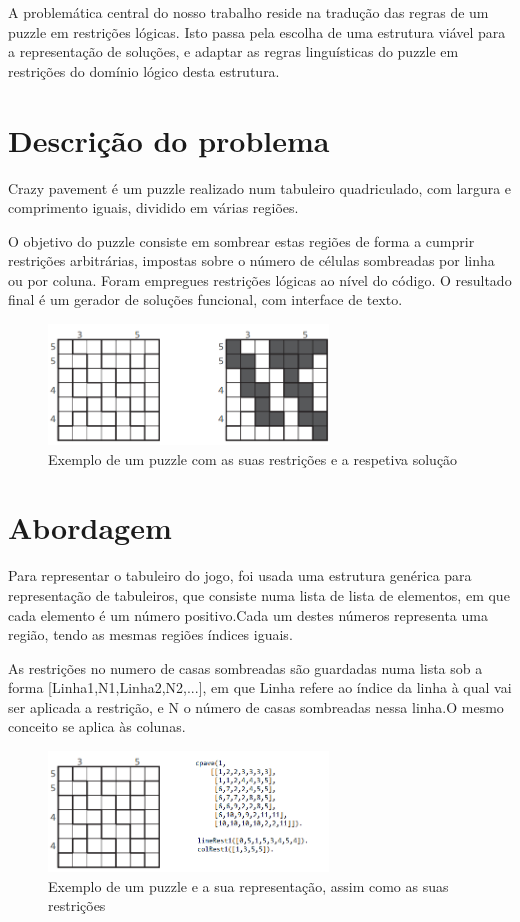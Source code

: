 \documentclass[runningheads,a4paper,12pt]{llncs}
\begin{document}
A problemática central do nosso trabalho reside na tradução das regras de um puzzle em restrições lógicas. Isto passa pela escolha de uma estrutura viável para a representação de soluções, e adaptar as regras linguísticas do puzzle em restrições do domínio lógico desta estrutura.

\section{Descrição do problema}

Crazy pavement é um puzzle realizado num tabuleiro quadriculado, com largura e comprimento iguais, dividido em várias regiões.

O objetivo do puzzle consiste em sombrear estas regiões de forma a cumprir restrições arbitrárias, impostas sobre o número de células sombreadas por linha ou por coluna. 
Foram empregues restrições lógicas ao nível do código. O resultado final é um gerador de soluções funcional, com interface de texto.
 
\begin{figure} 
\centering
\includegraphics[height=3.2cm]{exemplo1.png}
\caption{Exemplo de um puzzle com as suas restrições e a respetiva solução} 
\label{fig:crazypavementexandsol}
\end{figure}

\section{Abordagem}

Para representar o tabuleiro do jogo, foi usada uma estrutura genérica para representação de tabuleiros, que consiste numa lista de lista de elementos, em que cada elemento é um número positivo.Cada um destes números representa uma região, tendo as mesmas regiões índices iguais.

As restrições no numero de casas sombreadas são guardadas numa lista sob a forma [Linha1,N1,Linha2,N2,...], em que Linha refere ao índice da linha à qual vai ser aplicada a restrição, e N o número de casas sombreadas nessa linha.O mesmo conceito se aplica às colunas.

\begin{figure}
\centering
\includegraphics[height=3.2cm]{exemplo2.png}
\caption{Exemplo de um puzzle e a sua representação, assim como as suas restrições} 
\label{fig:crazypavementexandsol}
\end{figure}
\end{document}
